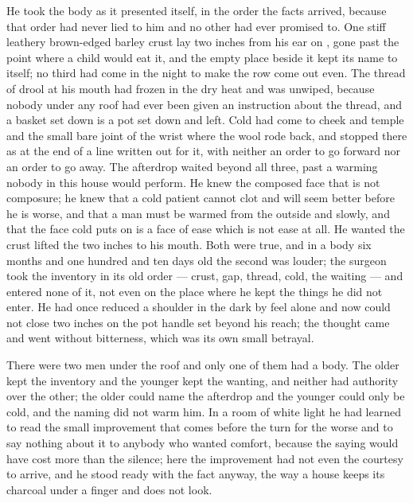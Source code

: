 He took the body as it presented itself, in the order the facts arrived, because that order had never lied to him and no other had ever promised to. One stiff leathery brown-edged barley crust lay two inches from his ear on , gone past the point where a child would eat it, and the empty place beside it kept its name to itself; no third had come in the night to make the row come out even. The thread of drool at his mouth had frozen in the dry heat and was unwiped, because nobody under any roof had ever been given an instruction about the thread, and a basket set down is a pot set down and left. Cold had come to cheek and temple and the small bare joint of the wrist where the wool rode back, and stopped there as at the end of a line written out for it, with neither an order to go forward nor an order to go away. The afterdrop waited beyond all three, past a warming nobody in this house would perform. He knew the composed face that is not composure; he knew that a cold patient cannot clot and will seem better before he is worse, and that a man must be warmed from the outside and slowly, and that the face cold puts on is a face of ease which is not ease at all. He wanted the crust lifted the two inches to his mouth. Both were true, and in a body six months and one hundred and ten days old the second was louder; the surgeon took the inventory in its old order --- crust, gap, thread, cold, the waiting --- and entered none of it, not even on the place where he kept the things he did not enter. He had once reduced a shoulder in the dark by feel alone and now could not close two inches on the pot handle set beyond his reach; the thought came and went without bitterness, which was its own small betrayal.

There were two men under the roof and only one of them had a body. The older kept the inventory and the younger kept the wanting, and neither had authority over the other; the older could name the afterdrop and the younger could only be cold, and the naming did not warm him. In a room of white light he had learned to read the small improvement that comes before the turn for the worse and to say nothing about it to anybody who wanted comfort, because the saying would have cost more than the silence; here the improvement had not even the courtesy to arrive, and he stood ready with the fact anyway, the way a house keeps its charcoal under a finger and does not look.

\scenebreak

